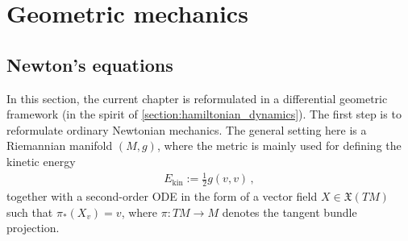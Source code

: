 \section{Geometric mechanics}
\subsection{Newton's equations}

    In this section, the current chapter is reformulated in a differential geometric framework (in the spirit of \cref{section:hamiltonian_dynamics}). The first step is to reformulate ordinary Newtonian mechanics. The general setting here is a Riemannian manifold $(M,g)$, where the metric is mainly used for defining the kinetic energy
    \begin{gather}
        E_{\text{kin}} := \frac{1}{2}g(v,v)\,,
    \end{gather}
    together with a second-order ODE in the form of a vector field $X\in \mathfrak{X}(TM)$ such that $\pi_*(X_v)=v$, where $\pi:TM\rightarrow M$ denotes the tangent bundle projection.

